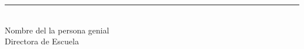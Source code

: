 \vspace{\baselineskip}
\vspace{\baselineskip}
\vspace{\baselineskip}
\noindent\rule{6cm}{0.5pt}\\
Nombre del la persona genial\\
Directora de Escuela\\
\newpage
